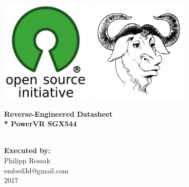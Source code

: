 \documentclass[a4paper,12pt,
headsepline,        %
oneside,            %
BCOR15mm          %
]{scrbook}
\makeatletter
\newcommand{\SGXtype}{SGX544}
\newcommand{\fullname}{Philipp Rossak}
\newcommand{\email}{embed3d@gmail.com}
\newcommand{\titeltext}{Reverse-Engineered Datasheet\\* PowerVR \SGXtype}
\newcommand{\jahr}{2017}
\makeatother
\begin{document}
	\frontmatter
	
	\thispagestyle{empty}
	\begin{addmargin*}[4mm]{-10mm}
		
		\includegraphics[height=5cm]{images/osi_standard_logo}
		\hspace{60mm}
		\includegraphics[height=5cm]{images/gerwinski-gnu-head}
		
		\vspace{60mm}
		{\footnotesize
			
			\parbox{140mm}{\bfseries \LARGE \titeltext}\\[2.5em]
			
			{\footnotesize \bfseries Executed by:}\\
			{\footnotesize \fullname\\\email}\\[2em]
			{\footnotesize\jahr}
		}
	\end{addmargin*}
	
	
	\tableofcontents
	
	\mainmatter
	\thispagestyle{empty}
	\newpage
	
	
	
	

	\listoffigures
    \listoftables
\end{document}
